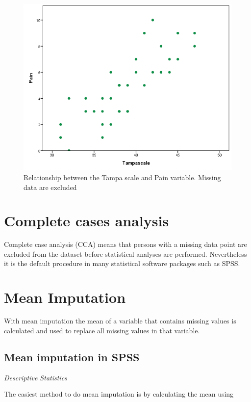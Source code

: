 \documentclass[]{book}
\begin{document}
\begin{figure}

{\centering \includegraphics[width=0.7\linewidth]{images/fig3.2b} 

}

\caption{Relationship between the Tampa scale and Pain variable. Missing data are excluded}\label{fig:fig3-2}
\end{figure}

\section{Complete cases analysis}\label{complete-cases-analysis}

Complete case analysis (CCA) means that persons with a missing data
point are excluded from the dataset before statistical analyses are
performed. Nevertheless it is the default procedure in many statistical
software packages such as SPSS.

\section{Mean Imputation}\label{mean-imputation}

With mean imputation the mean of a variable that contains missing values
is calculated and used to replace all missing values in that variable.

\subsection{Mean imputation in SPSS}\label{mean-imputation-in-spss}

\emph{Descriptive Statistics}

The easiest method to do mean imputation is by calculating the mean
using
\end{document}
